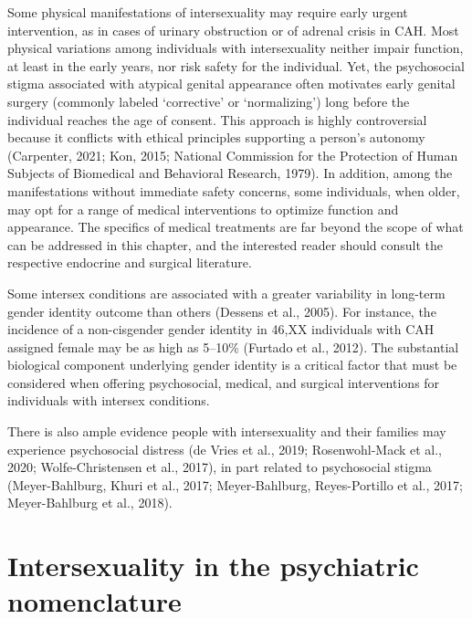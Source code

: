 \documentclass[
]{book}
\begin{document}
Some physical manifestations of intersexuality
may require early urgent intervention, as in cases
of urinary obstruction or of adrenal crisis in
CAH. Most physical variations among individuals
with intersexuality neither impair function, at
least in the early years, nor risk safety for the
individual. Yet, the psychosocial stigma associated
with atypical genital appearance often motivates
early genital surgery (commonly labeled `corrective' or `normalizing') long before the individual
reaches the age of consent. This approach is
highly controversial because it conflicts with ethical principles supporting a person's autonomy
(Carpenter, 2021; Kon, 2015; National Commission
for the Protection of Human Subjects of
Biomedical and Behavioral Research, 1979). In
addition, among the manifestations without
immediate safety concerns, some individuals,
when older, may opt for a range of medical interventions to optimize function and appearance.
The specifics of medical treatments are far beyond
the scope of what can be addressed in this chapter, and the interested reader should consult the
respective endocrine and surgical literature.

Some intersex conditions are associated with a
greater variability in long-term gender identity outcome than others (Dessens et al., 2005). For instance,
the incidence of a non-cisgender gender identity in
46,XX individuals with CAH assigned female may
be as high as 5--10\% (Furtado et al., 2012). The
substantial biological component underlying gender
identity is a critical factor that must be considered
when offering psychosocial, medical, and surgical
interventions for individuals with intersex conditions.

There is also ample evidence people with intersexuality and their families may experience psychosocial distress (de Vries et al., 2019;
Rosenwohl-Mack et al., 2020; Wolfe-Christensen
et al., 2017), in part related to psychosocial
stigma (Meyer-Bahlburg, Khuri et al., 2017;
Meyer-Bahlburg, Reyes-Portillo et al., 2017;
Meyer-Bahlburg et al., 2018).

\hypertarget{intersexuality-in-the-psychiatric-nomenclature}{%
\section*{Intersexuality in the psychiatric nomenclature}\label{intersexuality-in-the-psychiatric-nomenclature}}
\end{document}
